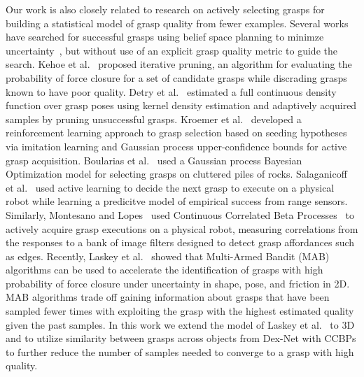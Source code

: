 Our work is also closely related to research on actively selecting grasps for building a statistical model of grasp quality from fewer examples.
Several works have searched for successful grasps using belief space planning to minimze uncertainty~\cite{hsiao2007grasping, kahnactive, fischinger2015learning}, but without use of an explicit grasp quality metric to guide the search.
Kehoe et al.~\cite{kehoe2012estimating} proposed iterative pruning, an algorithm for evaluating the probability of force closure for a set of candidate grasps while discrading grasps known to have poor quality.
Detry et al.~\cite{detry2011learning} estimated a full continuous density function over grasp poses using kernel density estimation and adaptively acquired samples by pruning unsuccessful grasps.
Kroemer et al.~\cite{kroemer2010combining} developed a reinforcement learning approach to grasp selection based on seeding hypotheses via imitation learning and Gaussian process upper-confidence bounds for active grasp acquisition.
Boularias et al.~\cite{boularias2014efficient, boularias2015learning} used a Gaussian process Bayesian Optimization model for selecting grasps on cluttered piles of rocks.
Salaganicoff et al.~\cite{salganicoff1996active} used active learning to decide the next grasp to execute on a physical robot while learning a predicitve model of empirical success from range sensors.
Similarly, Montesano and Lopes~\cite{montesano2012active} used Continuous Correlated Beta Processes~\cite{goetschalckx2011continuous} to actively acquire grasp executions on a physical robot, measuring correlations from the responses to a bank of image filters designed to detect grasp affordances such as edges.
Recently, Laskey et al.~\cite{laskey2015bandits} showed that Multi-Armed Bandit (MAB) algorithms can be used to accelerate the identification of grasps with high probability of force closure under uncertainty in shape, pose, and friction in 2D.
MAB algorithms trade off gaining information about grasps that have been sampled fewer times with exploiting the grasp with the highest estimated quality given the past samples.
In this work we extend the model of Laskey et al.~\cite{laskey2015bandits} to 3D and to utilize similarity between grasps across objects from Dex-Net with CCBPs to further reduce the number of samples needed to converge to a grasp with high quality.









